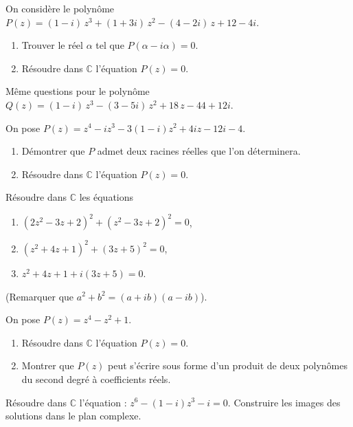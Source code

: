 %
\begin{exo}
      On consid\`ere le polyn\^ome 
      $P(z) = \left(1-i\right) \, z^{3} + \left(1 + 3 i\right) \, z^{2} - \left(4 - 2 i\right) \, z + 12 - 4 i$.
      \begin{enumerate}
            \item Trouver le r\'eel $\alpha$ tel que $P(\alpha - i\alpha) = 0$.
            \item R\'esoudre dans $\mathbb{C}$ l'\'equation $P(z) = 0$.
      \end{enumerate}
      M\^eme questions pour le polyn\^ome
      $Q(z) = \left(1-i\right) \, z^{3} - \left(3-5 i\right) \, z^{2} + 18 \, z - 44 + 12 i$.
\end{exo}
%
\begin{exo}
      On pose $P(z) = z^4 - i z^3 - 3 (1-i) z^2 + 4 i z - 12 i - 4 $.
      \begin{enumerate}
            \item D\'emontrer que $P$ admet deux racines r\'eelles que l'on d\'eterminera.
            \item R\'esoudre dans $\mathbb{C}$ l'\'equation $P(z) = 0$.
      \end{enumerate}
\end{exo}
%
\begin{exo}
      R\'esoudre dans $\mathbb{C}$ les \'equations 
      \begin{enumerate}
            \item $ (2z^2-3z+2)^2 + (z^2-3z+2)^2 = 0 $,
            \item $ (z^2 + 4z + 1)^2 + (3z+5)^2 = 0 $,
            \item $ z^2 + 4z + 1 + i (3z + 5) = 0 $.
      \end{enumerate}
      (Remarquer que $a^2 + b^2 = (a+ib)(a-ib)$).
\end{exo}
%
\begin{exo}
      On pose $P(z) = z^4 - z^2 + 1$.
      \begin{enumerate}
            \item R\'esoudre dans $\mathbb{C}$ l'\'equation $P(z) = 0$.
            \item Montrer que $P(z)$ peut s'\'ecrire sous forme d'un produit de 
                  deux polyn\^omes du second degr\'e \`a coefficients r\'eels.
      \end{enumerate}
\end{exo}
%
\begin{exo}
      R\'esoudre dans $\mathbb{C}$ l'\'equation : $z^6 - (1-i) z^3 - i = 0$.
      Construire les images des solutions dans le plan complexe.
\end{exo}
